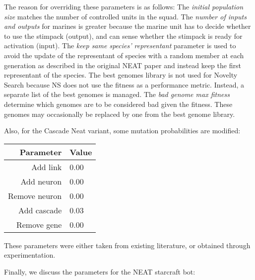 The reason for overriding these parameters is as follows: The
\emph{initial population size} matches the number of controlled units
in the squad.  The \emph{number of inputs and outputs} for marines is
greater because the marine unit has to decide whether to use the
stimpack (output), and can sense whether the stimpack is ready for
activation (input). The \emph{keep same species' representant}
parameter is used to avoid the update of the representant of species
with a random member at each generation as described in the original
NEAT paper and instead keep the first representant of the species. The
best genomes library is not used for Novelty Search because NS does
not use the fitness as a performance metric. Instead, a separate list
of the best genomes is managed. The \emph{bad genome max fitness}
determine which genomes are to be considered bad given the
fitness. These genomes may occasionally be replaced by one from the
best genome library.




Also, for the Cascade Neat variant, some mutation probabilities are modified:

\begin{tabular}{rl}
    \toprule
    Parameter & Value \\
    \midrule
    Add link & 0.00 \\
    Add neuron & 0.00 \\
    Remove neuron & 0.00 \\
    Add cascade & 0.03 \\
    Remove gene & 0.00 \\
    \bottomrule
\end{tabular}

These parameters were either taken from existing literature, or
obtained through experimentation.


Finally, we discuss the parameters for the NEAT starcraft bot:

